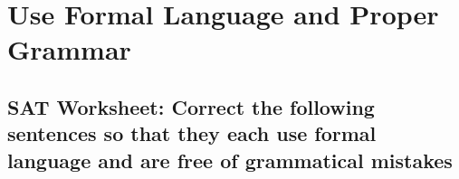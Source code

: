 \section{Use Formal Language and Proper Grammar}
\subsection{SAT Worksheet: Correct the following sentences so that they each use formal language and are free of grammatical mistakes}